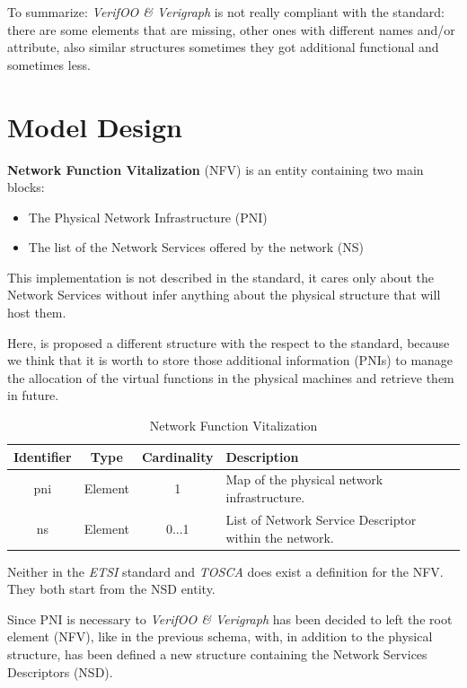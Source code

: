 \documentclass[11pt, english]{article}
\begin{document}
To summarize: \textit{VerifOO \& Verigraph} is not really compliant with the standard: there are some elements that are missing, other ones with different names and/or attribute, also similar structures sometimes they got additional functional and sometimes less.

\section{Model Design}
\textbf{Network Function Vitalization} (NFV) is an entity containing two main blocks:
\begin{itemize}
    \item The Physical Network Infrastructure (PNI)
    \item The list of the Network Services offered by the network (NS) 
\end{itemize}

This implementation is not described in the standard, it cares only about the Network Services without infer anything about the physical structure that will host them. 

Here, is proposed a different structure with the respect to the standard, because we think that it is worth to store those additional information (PNIs) to manage the allocation of the virtual functions in the physical machines and retrieve them in future.

\begin{table}[ht]
    \centering
    \begin{tabular}{c|c|c|m{7cm}}
    \hline
    Identifier & Type & Cardinality & Description \\
    \hline
    \rowcolor{Gray}
    pni & Element & 1 & Map of the physical network infrastructure. \\
    \hline
    ns & Element & 0...1 & List of Network Service Descriptor within the network. \\
    \hline
    \end{tabular}
    \caption{Network Function Vitalization} \label{tab:tab1}
\end{table}

Neither in the \emph{ETSI} standard and \emph{TOSCA} does exist a definition for the NFV. They both start from the NSD entity.

Since PNI is necessary to \emph{VerifOO \& Verigraph} has been decided to left the root element (NFV), like in the previous schema, with, in addition to the physical structure, has been defined a new structure containing the Network Services Descriptors (NSD).
\end{document}
